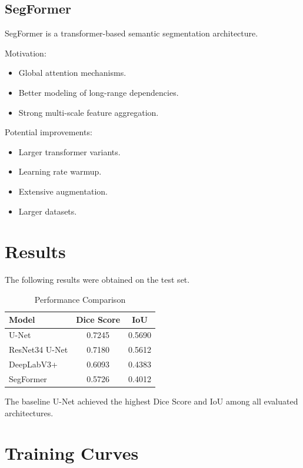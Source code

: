 \documentclass[12pt]{article}
\begin{document}
\subsection{SegFormer}

SegFormer is a transformer-based semantic segmentation architecture.

Motivation:

\begin{itemize}
\item Global attention mechanisms.
\item Better modeling of long-range dependencies.
\item Strong multi-scale feature aggregation.
\end{itemize}

Potential improvements:

\begin{itemize}
\item Larger transformer variants.
\item Learning rate warmup.
\item Extensive augmentation.
\item Larger datasets.
\end{itemize}

\section{Results}

The following results were obtained on the test set.

\begin{table}[H]
\centering
\caption{Performance Comparison}
\begin{tabular}{lcc}
\toprule
Model & Dice Score & IoU \\
\midrule
U-Net & 0.7245 & 0.5690 \\
ResNet34 U-Net & 0.7180 & 0.5612 \\
DeepLabV3+ & 0.6093 & 0.4383 \\
SegFormer & 0.5726 & 0.4012 \\
\bottomrule
\end{tabular}
\end{table}

The baseline U-Net achieved the highest Dice Score and IoU among all evaluated architectures.

\section{Training Curves}
\end{document}
